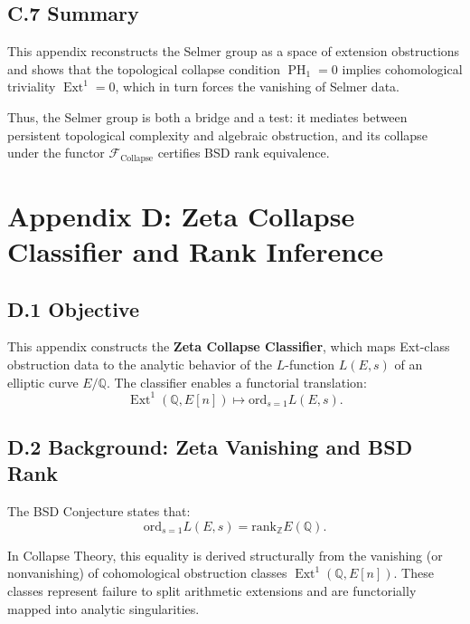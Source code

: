 \documentclass[11pt]{article}
\DeclareMathOperator{\Ext}{Ext}
\DeclareMathOperator{\PH}{PH}
\newcommand{\QQ}{\mathbb{Q}}
\newcommand{\ZZ}{\mathbb{Z}}
\begin{document}
\subsection*{C.7 Summary}

This appendix reconstructs the Selmer group as a space of extension obstructions and shows that the topological collapse condition $\PH_1 = 0$ implies cohomological triviality $\Ext^1 = 0$, which in turn forces the vanishing of Selmer data.

Thus, the Selmer group is both a bridge and a test: it mediates between persistent topological complexity and algebraic obstruction, and its collapse under the functor $\mathcal{F}_{\mathrm{Collapse}}$ certifies BSD rank equivalence.




\section*{Appendix D: Zeta Collapse Classifier and Rank Inference}

\subsection*{D.1 Objective}

This appendix constructs the \textbf{Zeta Collapse Classifier}, which maps Ext-class obstruction data to the analytic behavior of the $L$-function $L(E,s)$ of an elliptic curve $E/\QQ$.  
The classifier enables a functorial translation:
\[
\Ext^1(\QQ, E[n]) \mapsto \mathrm{ord}_{s=1} L(E,s).
\]

\subsection*{D.2 Background: Zeta Vanishing and BSD Rank}

The BSD Conjecture states that:
\[
\mathrm{ord}_{s=1} L(E,s) = \mathrm{rank}_{\ZZ} E(\QQ).
\]

In Collapse Theory, this equality is derived structurally from the vanishing (or nonvanishing) of cohomological obstruction classes $\Ext^1(\QQ,E[n])$.  
These classes represent failure to split arithmetic extensions and are functorially mapped into analytic singularities.
\end{document}
